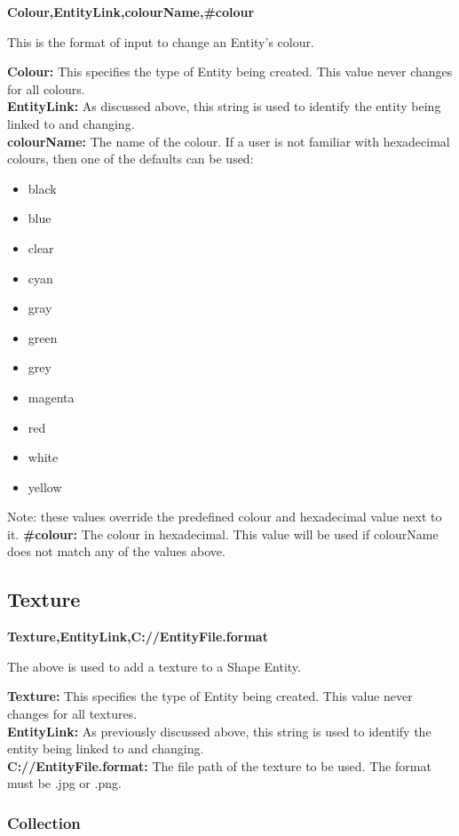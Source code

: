 \documentclass[a4paper,12pt]{article}
\begin{document}
\textbf{Colour,EntityLink,colourName,\#colour}

This is the format of input to change an Entity's colour.

\textbf{Colour:} This specifies the type of Entity being created. This value never changes for all colours.\\
\textbf{EntityLink:} As discussed above, this string is used to identify the entity being linked to and changing.\\
\textbf{colourName:} The name of the colour. If a user is not familiar with hexadecimal colours, then one of the defaults can be used:
\begin{itemize}
\item black
\item blue
\item clear
\item cyan
\item gray
\item green
\item grey
\item magenta
\item red
\item white
\item yellow
\end{itemize}
Note: these values override the predefined colour and hexadecimal value next to it.
\textbf{\#colour:} The colour in hexadecimal. This value will be used if colourName does not match any of the values above.

\subsection{Texture}

\textbf{Texture,EntityLink,C://EntityFile.format}

The above is used to add a texture to a Shape Entity.

\textbf{Texture:} This specifies the type of Entity being created. This value never changes for all textures.\\
\textbf{EntityLink:} As previously discussed above, this string is used to identify the entity being linked to and changing.\\
\textbf{C://EntityFile.format:} The file path of the texture to be used. The format must be .jpg or .png.

\subsubsection{Collection}
\end{document}
